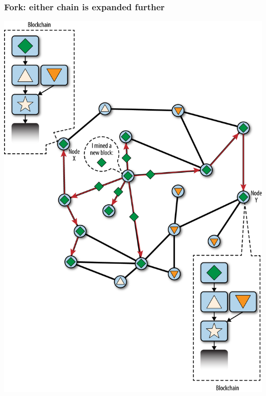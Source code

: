 \documentclass[11pt]{beamer}  %
\begin{document}
\begin{frame}\frametitle{Fork: either chain is expanded further}

  \begin{center}
    \includegraphics[scale=0.47,clip=false]{pictures/mbc2_1005.png}
  \end{center}

\end{frame}
\end{document}
